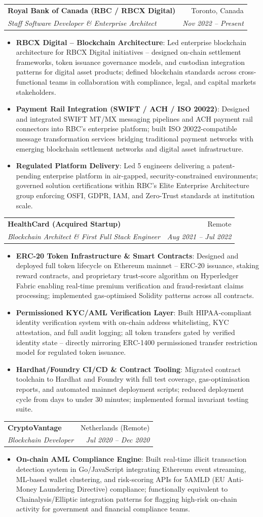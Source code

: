 \documentclass[letterpaper,9.5pt]{article}
\makeatletter
\newcommand{\resumeItem}[2]{\item\small{\textbf{#1}{: #2 \vspace{-2pt}}}}
\newcommand{\resumeSubheading}[4]{\vspace{-2pt}\item\begin{tabular*}{0.97\textwidth}{l@{\extracolsep{\fill}}r}\textbf{#1} & #2 \\\textit{\small#3} & \textit{\small #4} \\\end{tabular*}\vspace{-6pt}}
\newcommand{\resumeItemListStart}{\begin{itemize}}
\newcommand{\resumeItemListEnd}{\end{itemize}\vspace{-6pt}}
\makeatother
\begin{document}
  \resumeSubheading
    {Royal Bank of Canada (RBC / RBCX Digital)}{Toronto, Canada}
    {Staff Software Developer \& Enterprise Architect}{Nov 2022 -- Present}
  \resumeItemListStart
    \resumeItem{RBCX Digital -- Blockchain Architecture}{Led enterprise blockchain architecture for RBCX Digital initiatives -- designed on-chain settlement frameworks, token issuance governance models, and custodian integration patterns for digital asset products; defined blockchain standards across cross-functional teams in collaboration with compliance, legal, and capital markets stakeholders.}
    \resumeItem{Payment Rail Integration (SWIFT / ACH / ISO 20022)}{Designed and integrated SWIFT MT/MX messaging pipelines and ACH payment rail connectors into RBC's enterprise platform; built ISO 20022-compatible message transformation services bridging traditional payment networks with emerging blockchain settlement networks and digital asset infrastructure.}
    \resumeItem{Regulated Platform Delivery}{Led 5 engineers delivering a patent-pending enterprise platform in air-gapped, security-constrained environments; governed solution certifications within RBC's Elite Enterprise Architecture group enforcing OSFI, GDPR, IAM, and Zero-Trust standards at institution scale.}
  \resumeItemListEnd

  \resumeSubheading
    {HealthCard (Acquired Startup)}{Remote}
    {Blockchain Architect \& First Full Stack Engineer}{Aug 2021 -- Jul 2022}
  \resumeItemListStart
    \resumeItem{ERC-20 Token Infrastructure \& Smart Contracts}{Designed and deployed full token lifecycle on Ethereum mainnet -- ERC-20 issuance, staking reward contracts, and proprietary trust-score algorithm on Hyperledger Fabric enabling real-time premium verification and fraud-resistant claims processing; implemented gas-optimised Solidity patterns across all contracts.}
    \resumeItem{Permissioned KYC/AML Verification Layer}{Built HIPAA-compliant identity verification system with on-chain address whitelisting, KYC attestation, and full audit logging; all token transfers gated by verified identity state -- directly mirroring ERC-1400 permissioned transfer restriction model for regulated token issuance.}
    \resumeItem{Hardhat/Foundry CI/CD \& Contract Tooling}{Migrated contract toolchain to Hardhat and Foundry with full test coverage, gas-optimisation reports, and automated mainnet deployment scripts; reduced deployment cycle from days to under 30 minutes; implemented formal invariant testing suite.}
  \resumeItemListEnd

  \resumeSubheading
    {CryptoVantage}{Netherlands (Remote)}
    {Blockchain Developer}{Jul 2020 -- Dec 2020}
  \resumeItemListStart
    \resumeItem{On-chain AML Compliance Engine}{Built real-time illicit transaction detection system in Go/JavaScript integrating Ethereum event streaming, ML-based wallet clustering, and risk-scoring APIs for 5AMLD (EU Anti-Money Laundering Directive) compliance; functionally equivalent to Chainalysis/Elliptic integration patterns for flagging high-risk on-chain activity for government and financial compliance teams.}
  \resumeItemListEnd
\end{document}
